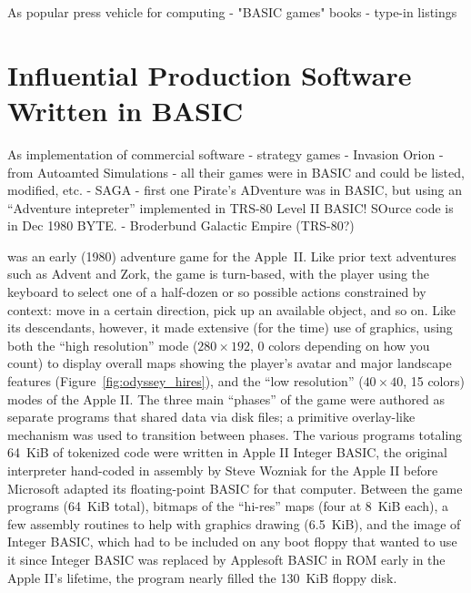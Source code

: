 \documentclass{article}
\begin{document}
As popular press vehicle for computing
  - "BASIC games" books
  - type-in listings



\section{Influential Production Software Written in BASIC}




As implementation of commercial software - strategy games
  - Invasion Orion - from Autoamted Simulations - all their games were
  in BASIC and could be listed, modified, etc.
  - SAGA - first one Pirate's ADventure was in BASIC, but using an
  ``Adventure intepreter'' implemented in TRS-80 Level II BASIC!  SOurce
  code is in Dec 1980 BYTE.
  - Broderbund Galactic Empire (TRS-80?)



 was an early (1980) adventure game
for the Apple~II.
Like prior text adventures such as Advent and Zork, the game is
turn-based, with the player using the 
keyboard to select one of a half-dozen or so possible actions
constrained by context: move in a certain direction, pick up an
available object, and so on.
Like its descendants, however, it made extensive (for the time) use of
graphics, using both the ``high resolution'' mode ($280\times 192$, 0 colors
depending on how you count) to display overall maps showing the player's
avatar and major landscape features (Figure~\ref{fig:odyssey_hires}), and the
``low resolution'' ($40\times 40$, 15
colors) modes of the Apple II.
The three main ``phases'' of the game were authored as separate programs
that shared data via disk files; a primitive overlay-like mechanism was
used to transition between phases.  
The various programs totaling 64~KiB of tokenized code were written in Apple II Integer
BASIC, the
original interpreter hand-coded in assembly by Steve Wozniak for
the Apple II before Microsoft adapted its floating-point BASIC for that
computer.  Between the game programs (64~KiB total), bitmaps of the ``hi-res''
maps (four at 8~KiB each), a few assembly routines to help with graphics
drawing (6.5~KiB), and the image of Integer BASIC, which had to be
included on any boot floppy that wanted to use it since Integer BASIC
was replaced by Applesoft BASIC in ROM early in the Apple II's lifetime,
the program nearly filled the 130~KiB floppy disk.
\end{document}
